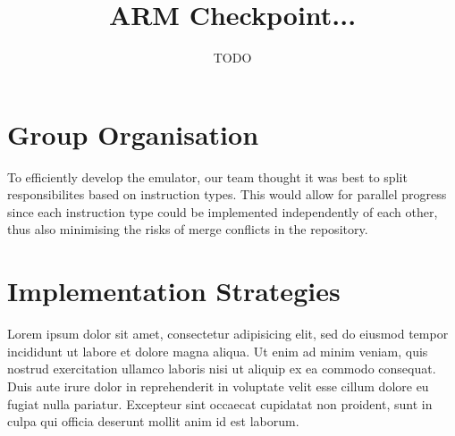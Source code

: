 \documentclass[11pt]{article}
\begin{document}
\title{ARM Checkpoint... }
\author{TODO}

\maketitle

\section{Group Organisation}

To efficiently develop the emulator, our team thought it was best to split responsibilites based on instruction types. This would allow for parallel progress since each instruction type could be implemented independently of each other, thus also minimising the risks of merge conflicts in the repository.   

\section{Implementation Strategies}

Lorem ipsum dolor sit amet, consectetur adipisicing elit, sed do eiusmod tempor
incididunt ut labore et dolore magna aliqua. Ut enim ad minim veniam, quis
nostrud exercitation ullamco laboris nisi ut aliquip ex ea commodo consequat.
Duis aute irure dolor in reprehenderit in voluptate velit esse cillum dolore eu
fugiat nulla pariatur. Excepteur sint occaecat cupidatat non proident, sunt in
culpa qui officia deserunt mollit anim id est laborum.
\end{document}
